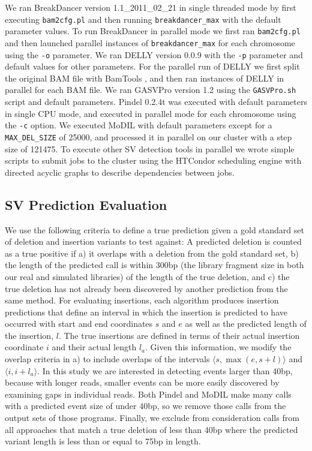 \documentclass[11pt]{article}
\begin{document}
We ran BreakDancer version 1.1\_2011\_02\_21 in single threaded mode by first executing \texttt{bam2cfg.pl} and then running \texttt{breakdancer\_max} with the default parameter values.  To run BreakDancer in parallel mode we first ran \texttt{bam2cfg.pl} and then launched parallel instances of \texttt{breakdancer\_max} for each chromosome using the \texttt{-o} parameter. We ran DELLY version 0.0.9 with the \texttt{-p} parameter and default values for other parameters. For the parallel run of DELLY we first split the original BAM file with BamTools \citep{Barnett:2011hm}, and then ran instances of DELLY in parallel for each BAM file. We ran GASVPro version 1.2 using the \texttt{GASVPro.sh} script and default parameters. Pindel 0.2.4t was executed with default parameters in single CPU mode, and executed in parallel mode for each chromosome using the \texttt{-c} option. We executed MoDIL with default parameters except for a \texttt{MAX\_DEL\_SIZE} of 25000, and processed it in parallel on our cluster with a step size of 121475. To execute other SV detection tools in parallel we wrote simple scripts to submit jobs to the cluster using the HTCondor scheduling engine \citep{condor-practice} with directed acyclic graphs to describe dependencies between jobs. 

\subsection{SV Prediction Evaluation}

We use the following criteria to define a true prediction given a gold standard set of deletion and insertion variants to test against: A predicted deletion is counted as a true positive if a) it overlaps with a deletion from the gold standard set, b) the length of the predicted call is within 300bp (the library fragment size in both our real and simulated libraries) of the length of the true deletion, and c) the true deletion has not already been discovered by another prediction from the same method. For evaluating insertions, each algorithm produces insertion predictions that define an interval in which the insertion is predicted to have occurred with start and end coordinates $s$ and $e$ as well as the predicted length of the insertion, $l$. The true insertions are defined in terms of their actual insertion coordinate $i$ and their actual length $l_a$. Given this information, we modify the overlap criteria in a) to include overlaps of the intervals $\langle s,\max{\left(e,s+l\right)} \rangle$ and $\langle i,i+l_a \rangle$. In this study we are interested in detecting events larger than 40bp, because with longer reads, smaller events can be more easily discovered by examining gaps in individual reads. Both Pindel and MoDIL make many calls with a predicted event size of under 40bp, so we remove those calls from the output sets of those programs. Finally, we exclude from consideration calls from all approaches that match a true deletion of less than 40bp where the predicted variant length is less than or equal to 75bp in length.
\end{document}
